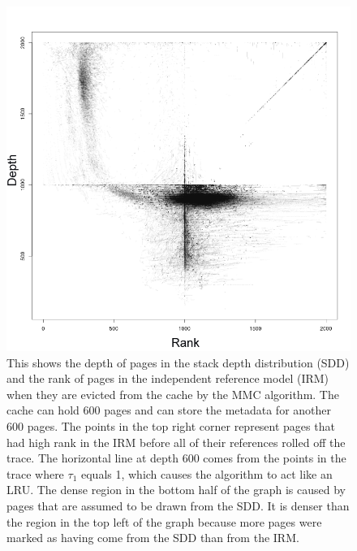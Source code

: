   \begin{figure}
  \centering
  \includegraphics[width=6in]{../media/ev_1000_1000_4000_2.png}
  \caption[Eviction scatterplot for 1000 page MMC cache]{This shows the depth of
  pages in the stack depth distribution (SDD) and the rank of pages in the
  independent reference model (IRM) when they are evicted from the cache by the
  MMC algorithm. The cache can hold 600 pages and can store the metadata for
  another 600 pages. The points in the top right corner represent pages that had
  high rank in the IRM before all of their references rolled off the trace.
  The horizontal line at depth 600 comes from the points in the trace where
  $\tau_1$ equals 1, which causes the algorithm to act like an LRU. The dense
  region in the bottom half of the graph is caused by pages that are assumed to
  be drawn from the SDD. It is denser than the region in the top left of the
  graph because more pages were marked as having come from the SDD than from the
  IRM.}
  \label{fig:ev_1000_financial1}
  \end{figure}

